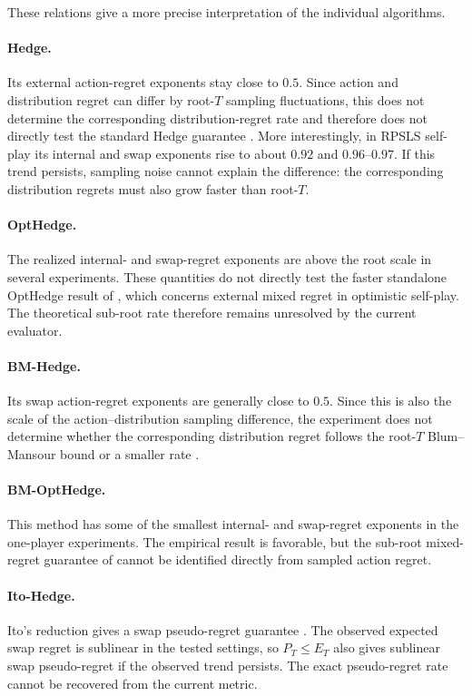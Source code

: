 These relations give a more precise interpretation of the individual
algorithms.

\paragraph{Hedge.}
Its external action-regret exponents stay close to \(0.5\). Since action and
distribution regret can differ by root-\(T\) sampling fluctuations, this does
not determine the corresponding distribution-regret rate and therefore does
not directly test the standard Hedge guarantee \citep{freund_decision-theoretic_1997}.
More interestingly, in RPSLS self-play its internal and swap exponents rise
to about \(0.92\) and \(0.96\)--\(0.97\). If this trend persists, sampling
noise cannot explain the difference: the corresponding distribution regrets
must also grow faster than root-\(T\).

\paragraph{OptHedge.}
The realized internal- and swap-regret exponents are above the root scale in
several experiments. These quantities do not directly test the faster
standalone OptHedge result of \citet{chen_hedging_2020}, which concerns
external mixed regret in optimistic self-play. The theoretical sub-root rate
therefore remains unresolved by the current evaluator.

\paragraph{BM-Hedge.}
Its swap action-regret exponents are generally close to \(0.5\). Since this is
also the scale of the action--distribution sampling difference, the experiment
does not determine whether the corresponding distribution regret follows the
root-\(T\) Blum--Mansour bound or a smaller rate
\citep{blum_external_2007}.

\paragraph{BM-OptHedge.}
This method has some of the smallest internal- and swap-regret exponents in the
one-player experiments. The empirical result is favorable, but the
sub-root mixed-regret guarantee of \citet{chen_hedging_2020} cannot be
identified directly from sampled action regret.

\paragraph{Ito-Hedge.}
Ito's reduction gives a swap pseudo-regret guarantee
\citep{ito_tight_2020}. The observed expected swap regret is sublinear in the
tested settings, so \(P_T\le E_T\) also gives sublinear swap pseudo-regret if
the observed trend persists. The exact pseudo-regret rate cannot be recovered
from the current metric.

